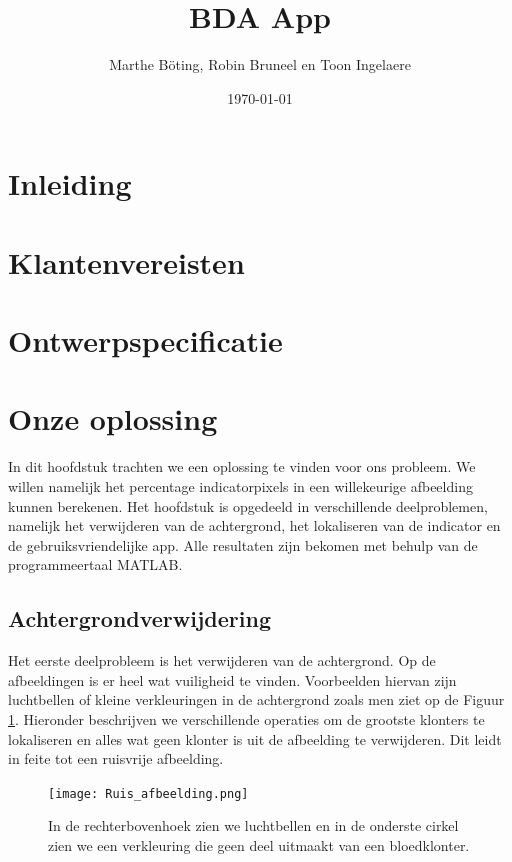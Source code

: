 \documentclass[a4paper,kulak]{kulakarticle}
\date{\today}
\title{BDA App}
\author{Marthe B\"{o}ting, Robin Bruneel en Toon Ingelaere}
\begin{document}
	
	
	\maketitle
	\section*{Inleiding}
		

\tableofcontents

\section{Klantenvereisten}


\section{Ontwerpspecificatie}


\section{Onze oplossing}
In dit hoofdstuk trachten we een oplossing te vinden voor ons probleem. We willen namelijk het percentage indicatorpixels in een willekeurige afbeelding kunnen berekenen. Het hoofdstuk is opgedeeld in verschillende deelproblemen, namelijk het verwijderen van de achtergrond, het lokaliseren van de indicator en de gebruiksvriendelijke app. Alle resultaten zijn bekomen met behulp van de programmeertaal MATLAB.

\subsection{Achtergrondverwijdering}
Het eerste deelprobleem is het verwijderen van de achtergrond. Op de afbeeldingen is er heel wat vuiligheid te vinden. Voorbeelden hiervan zijn luchtbellen of kleine verkleuringen in de achtergrond zoals men ziet op de Figuur \ref{figuur achtergrondverwijdering}. Hieronder beschrijven we verschillende operaties om de grootste klonters te lokaliseren en alles wat geen klonter is uit de afbeelding te verwijderen. Dit leidt in feite tot een ruisvrije afbeelding.

\begin{figure}[H]
	\centering
	\texttt{[image: Ruis\_afbeelding.png]}	
	\caption{In de rechterbovenhoek zien we luchtbellen en in de onderste cirkel zien we een verkleuring die geen deel uitmaakt van een bloedklonter.}
	\label{figuur achtergrondverwijdering}
\end{figure}
\end{document}
